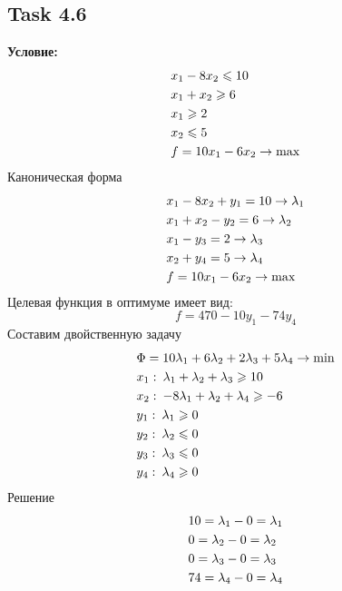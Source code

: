\documentclass[12pt]{article}
\begin{document}
\subsection*{Task 4.6}
\textbf{Условие:}
\begin{align}
  &x_1-8x_2\leqslant10\notag\\
  &x_1+x_2\geqslant6\notag\\
  &x_1\geqslant2\\
  &x_2\leqslant5\notag\\
  &f=10x_1-6x_2\to\max\notag
\end{align}
Каноническая форма
\begin{align}
  &x_1-8x_2+y_1=10\to\lambda_1\notag\\
  &x_1+x_2-y_2=6\to\lambda_2\notag\\
  &x_1-y_3=2\to\lambda_3\\
  &x_2+y_4=5\to\lambda_4\notag\\
  &f=10x_1-6x_2\to\max\notag
\end{align}
Целевая функция в оптимуме имеет вид:
\begin{equation}
  f=470-10y_1-74y_4
\end{equation}
Составим двойственную задачу
\begin{align}
 &\Phi=10\lambda_1+6\lambda_2+2\lambda_3+5\lambda_4\to\min\notag\\
 &x_1:\: \lambda_1 +\lambda_2+\lambda_3 \geqslant 10\notag\\
 &x_2:\: -8\lambda_1 +\lambda_2+\lambda_4 \geqslant -6\notag\\
 &y_1:\: \lambda_1 \geqslant 0\notag\\
 &y_2:\: \lambda_2 \leqslant 0\\
 &y_3:\: \lambda_3 \leqslant 0\\
 &y_4:\: \lambda_4 \geqslant 0\notag
\end{align}
Решение
\begin{align}
  &10=\lambda_1-0=\lambda_1\notag\\
  &0=\lambda_2-0=\lambda_2\\
  &0=\lambda_3-0=\lambda_3\notag\\
  &74=\lambda_4-0=\lambda_4\notag
\end{align}
\end{document}
